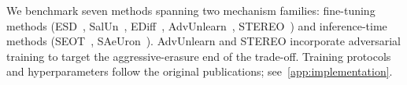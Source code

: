 We benchmark seven methods spanning two mechanism families: fine-tuning methods (ESD~\citep{gandikota2023erasing}, 
SalUn~\citep{fan2023salun}, 
EDiff~\citep{wu2024erasediff}, 
AdvUnlearn~\citep{zhang2024defensive}, 
STEREO~\citep{srivatsan2025stereo}) 
and inference-time methods 
(SEOT~\citep{li2024get}, SAeUron~\citep{cywinski2025saeuron}). 
AdvUnlearn and STEREO incorporate adversarial training to target the aggressive-erasure end of the trade-off. Training protocols and hyperparameters follow the original publications; see~\cref{app:implementation}.

